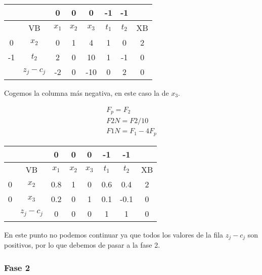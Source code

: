 \begin{itemize}
    \begin{table}[H]
        \centering
        \begin{tabular}{|c|c|c|c|c|c|c|c|}
        \hline
        &  & 0 & 0 & 0 & -1 & -1 &\\
        \hline
        & VB & $x_1$ & $x_2$ & $x_3$ & $t_1$ & $t_2$ & XB \\
        \hline
        0 & $x_2$ & 0 & 1 & 4 & 1 & 0 & 2\\
        \hline
        -1 & $t_2$ & 2 & 0 & 10 & 1& -1 &0\\
        \hline
        & $z_j - c_j$ & -2 & 0& -10 & 0 & 2 &0\\
        \hline
        \end{tabular}
    \end{table}

    Cogemos la columna más negativa, en este caso la de $x_3$.

    \begin{align*}
        F_p = F_2\\
        F2N = F2 / 10\\
        F1N = F_1 - 4F_p
    \end{align*}

    \begin{table}[H]
        \centering
        \begin{tabular}{|c|c|c|c|c|c|c|c|}
        \hline
        &  & 0 & 0 & 0 & -1 & -1 &\\
        \hline
        & VB & $x_1$ & $x_2$ & $x_3$ & $t_1$ & $t_2$ & XB \\
        \hline
        0 & $x_2$ & 0.8 & 1 & 0 & 0.6 & 0.4 & 2\\
        \hline
        0 & $x_3$ & 0.2 & 0 & 1 & 0.1 & -0.1 & 0\\       \hline
        & $z_j - c_j$ & 0 & 0& 0 & 1 & 1 &0\\
        \hline
        \end{tabular}
    \end{table}

    En este punto no podemos continuar ya que todos los valores de la fila $z_j - c_j$ son positivos, por lo que debemos de pasar a la fase 2.

    \subsubsection*{Fase 2}


\end{itemize}
